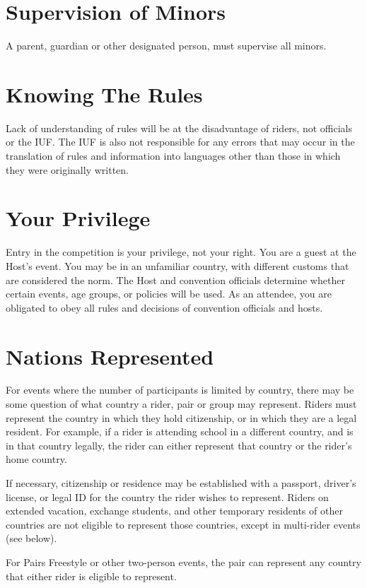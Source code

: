 \section{Supervision of Minors}
A parent, guardian or other designated person, must supervise all minors.

\section{Knowing The Rules}
Lack of understanding of rules will be at the disadvantage of riders, not officials or the IUF.
The IUF is also not responsible for any errors that may occur in the translation of rules and information into languages other than those in which they were originally written.

\section{Your Privilege}
Entry in the competition is your privilege, not your right.
You are a guest at the Host's event.
You may be in an unfamiliar country, with different customs that are considered the norm.
The Host and convention officials determine whether certain events, age groups, or policies will be used.
As an attendee, you are obligated to obey all rules and decisions of convention officials and hosts.

\section{Nations Represented}
For events where the number of participants is limited by country, there may be some question of what country a rider, pair or group may represent.
Riders must represent the country in which they hold citizenship, or in which they are a legal resident.
For example, if a rider is attending school in a different country, and is in that country legally, the rider can either represent that country or the rider's home country.

If necessary, citizenship or residence may be established with a passport, driver's license, or legal ID for the country the rider wishes to represent.
Riders on extended vacation, exchange students, and other temporary residents of other countries are not eligible to represent those countries, except in multi-rider events (see below).

For Pairs Freestyle or other two-person events, the pair can represent any country that either rider is eligible to represent.


